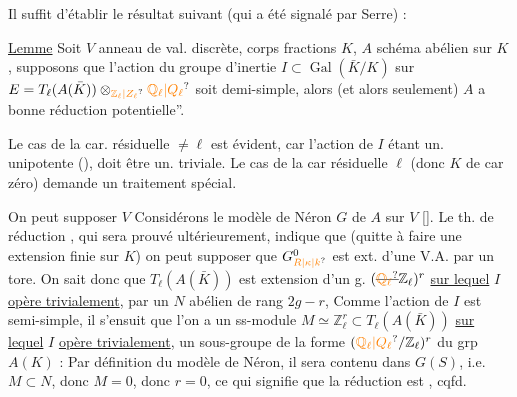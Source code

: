 
Il suffit d'établir le résultat suivant (qui a été signalé par Serre) :

\uline{Lemme} Soit $V$ anneau de val. discrète, corps fractions $K$, $A$ schéma abélien sur $K$,  supposons que l'action du groupe d'inertie  $I\subset\operatorname{Gal}(\bar K/K)$ sur $E=T_\ell(A(\bar K))\otimes_{\unsure{\mathbb Z_\ell|Z_\ell}}\unsure{\mathbb Q_\ell|Q_\ell}$ soit   demi-simple,  alors  (et alors seulement) $A$ a bonne réduction potentielle''.


Le cas de la car. résiduelle $\ne\ell$ est évident, car l'action de $I$ étant un. unipotente (),  doit être un. triviale.  Le cas de la car résiduelle $\ell$ (donc $K$ de car zéro) demande un traitement spécial.

On peut supposer $V$   Considérons le modèle de Néron  $G$ de $A$ sur $V$ [\quad].  Le th. de réduction , qui sera prouvé ultérieurement, indique que (quitte à faire une extension finie sur $K$) on peut supposer que $G_{\unsure{R|\kappa|k}}^0$ est ext. d'une V.A. par un tore.  On sait donc que $T_\ell(A(\bar K))$ est extension d'un g.
  $(\deleted{\unsure{\mathbb Q_\ell}}\mathbb Z_\ell)^r$ \uline{sur lequel} $I$ \uline{opère trivialement}, par un  $N$ abélien de rang $2g-r$,  Comme l'action de $I$ est semi-simple, il s'ensuit que l'on a un ss-module $M\simeq\mathbb Z_\ell^r\subset T_\ell(A(\bar K))$ \uline{sur lequel} $I$ \uline{opère trivialement},   un sous-groupe de la forme $(\unsure{\mathbb Q_\ell|Q_\ell}/\mathbb Z_\ell)^r$ du grp $A(K)$ : Par définition du modèle de Néron, il sera contenu dans $G(S)$, i.e. $M\subset N$, donc $M=0$, donc $r=0$, ce qui signifie que la réduction est , cqfd.

